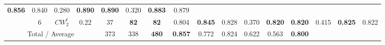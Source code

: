 \begin{table}[tph]
\begin{adjustbox}{angle=90}
{\begin{tabular}{c|c|cc|ccc|ccc|ccc|ccc}
                \textbf{0.856}
                                                                        & 0.840
                                                                        & 0.280                          &
                \textbf{0.890}
                                                                        &
                \textbf{0.890}
                                                                        & 0.320
                                                                        &
                \textbf{0.883}
                                                                        & 0.879
                \\
                                                                        & 6
                                                                        & $CW_{2}^{t}$                   & 0.22 & 37 &
                \textbf{82}
                                                                        &
                \textbf{82}
                                                                        & 0.804
                                                                        &
                \textbf{0.845}
                                                                        & 0.828
                                                                        & 0.370                          &
                \textbf{0.820}
                                                                        &
                \textbf{0.820}
                                                                        & 0.415
                                                                        &
                \textbf{0.825}
                                                                        & 0.822
                \\
                \midrule
                \multicolumn{4}{c|}{Total / Average}                    & 373
                                                                        & 338                            &
                \textbf{480}
                                                                        &
                \textbf{0.857}
                                                                        & 0.772
                                                                        & 0.824
                                                                        & 0.622
                                                                        & 0.563
                                                                        &
                \textbf{0.800}

\end{tabular}}
\end{adjustbox}
\end{table}

